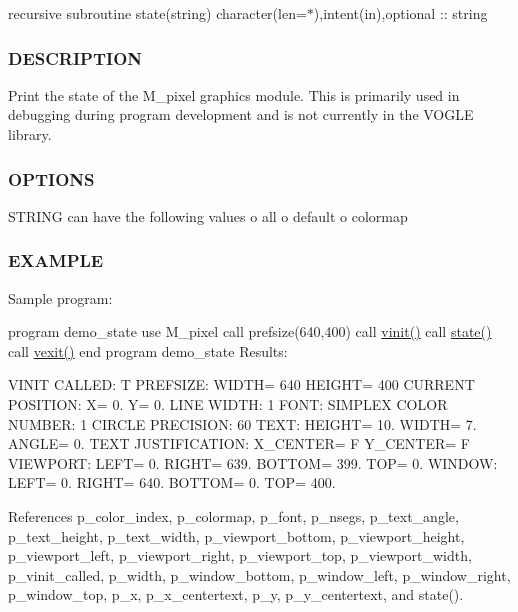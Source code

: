 recursive subroutine state(string) character(len=$\ast$),intent(in),optional \+:\+: string

\subsubsection*{D\+E\+S\+C\+R\+I\+P\+T\+I\+ON}

Print the state of the M\+\_\+pixel graphics module. This is primarily used in debugging during program development and is not currently in the V\+O\+G\+LE library.

\subsubsection*{O\+P\+T\+I\+O\+NS}

S\+T\+R\+I\+NG can have the following values o all o default o colormap

\subsubsection*{E\+X\+A\+M\+P\+LE}

Sample program\+:

program demo\+\_\+state use M\+\_\+pixel call prefsize(640,400) call \hyperlink{namespacem__pixel_ac03ca8f23fdadb60599b6ea4dc87a6d9}{vinit()} call \hyperlink{namespacem__pixel_aa24c465b23b0ddda341e97bc206fe249}{state()} call \hyperlink{namespacem__pixel_a19ad6b65752322b0029a62cc0ebec3e8}{vexit()} end program demo\+\_\+state Results\+:

V\+I\+N\+IT C\+A\+L\+L\+ED\+: T P\+R\+E\+F\+S\+I\+ZE\+: W\+I\+D\+TH= 640 H\+E\+I\+G\+HT= 400 C\+U\+R\+R\+E\+NT P\+O\+S\+I\+T\+I\+ON\+: X= 0. Y= 0. L\+I\+NE W\+I\+D\+TH\+: 1 F\+O\+NT\+: S\+I\+M\+P\+L\+EX C\+O\+L\+OR N\+U\+M\+B\+ER\+: 1 C\+I\+R\+C\+LE P\+R\+E\+C\+I\+S\+I\+ON\+: 60 T\+E\+XT\+: H\+E\+I\+G\+HT= 10. W\+I\+D\+TH= 7. A\+N\+G\+LE= 0. T\+E\+XT J\+U\+S\+T\+I\+F\+I\+C\+A\+T\+I\+ON\+: X\+\_\+\+C\+E\+N\+T\+ER= F Y\+\_\+\+C\+E\+N\+T\+ER= F V\+I\+E\+W\+P\+O\+RT\+: L\+E\+FT= 0. R\+I\+G\+HT= 639. B\+O\+T\+T\+OM= 399. T\+OP= 0. W\+I\+N\+D\+OW\+: L\+E\+FT= 0. R\+I\+G\+HT= 640. B\+O\+T\+T\+OM= 0. T\+OP= 400. 

References p\+\_\+color\+\_\+index, p\+\_\+colormap, p\+\_\+font, p\+\_\+nsegs, p\+\_\+text\+\_\+angle, p\+\_\+text\+\_\+height, p\+\_\+text\+\_\+width, p\+\_\+viewport\+\_\+bottom, p\+\_\+viewport\+\_\+height, p\+\_\+viewport\+\_\+left, p\+\_\+viewport\+\_\+right, p\+\_\+viewport\+\_\+top, p\+\_\+viewport\+\_\+width, p\+\_\+vinit\+\_\+called, p\+\_\+width, p\+\_\+window\+\_\+bottom, p\+\_\+window\+\_\+left, p\+\_\+window\+\_\+right, p\+\_\+window\+\_\+top, p\+\_\+x, p\+\_\+x\+\_\+centertext, p\+\_\+y, p\+\_\+y\+\_\+centertext, and state().

